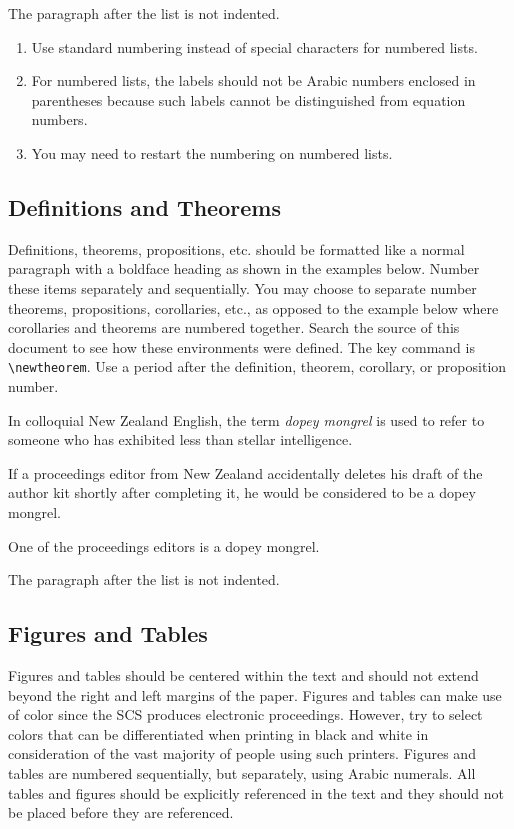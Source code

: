 \documentclass{article}
\begin{document}
The paragraph after the list is not indented.
\begin{enumerate}
	\item Use standard numbering instead of special characters for numbered lists.
	\item For numbered lists, the labels should not be Arabic numbers enclosed in parentheses because such labels cannot be distinguished from equation numbers.
	\item You may need to restart the numbering on numbered lists.
\end{enumerate}


\subsection{Definitions and Theorems}
Definitions, theorems, propositions, etc. should be formatted like a normal paragraph with a boldface heading as shown in the examples below. Number these items separately and sequentially. You may choose to separate number theorems, propositions, corollaries, etc., as opposed to the example below where corollaries and theorems are numbered together. Search the source of this document to see how these environments were defined. The key command is \verb+\newtheorem+. Use a period after the definition, theorem, corollary, or proposition number.

\begin{definition}
In colloquial New Zealand English, the term \emph{dopey mongrel} is used to refer to someone who has exhibited less than stellar intelligence.
\end{definition}

\begin{theorem}
If a proceedings editor from New Zealand accidentally deletes his draft of the author kit shortly after completing it, he would be considered to be a dopey mongrel.
\end{theorem}

\begin{corollary}
One of the proceedings editors is a dopey mongrel.
\end{corollary}

The paragraph after the list is not indented.


\subsection{Figures and Tables}
\label{sec:graphics}
Figures and tables should be centered within the text and should not extend beyond the right and left margins of the paper. Figures and tables can make use of color since the SCS produces electronic proceedings. However, try to select colors that can be differentiated when printing in black and white in consideration of the vast majority of people using such printers. Figures and tables are numbered sequentially, but separately, using Arabic numerals. All tables and figures should be explicitly referenced in the text and they should not be placed before they are referenced.
\end{document}
